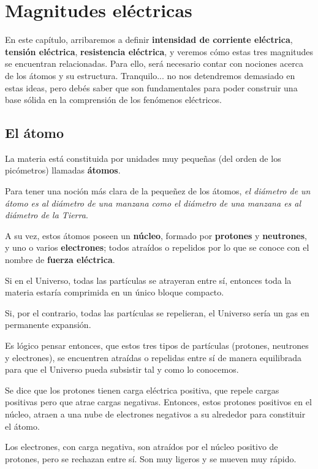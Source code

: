 \chapter{Magnitudes eléctricas}

En este capítulo, arribaremos a definir \textbf{intensidad de corriente eléctrica}, \textbf{tensión eléctrica}, \textbf{resistencia eléctrica}, y veremos cómo estas tres magnitudes se encuentran relacionadas. Para ello, será necesario contar con nociones acerca de los átomos y su estructura. Tranquilo... no nos detendremos demasiado en estas ideas, pero debés saber que son fundamentales para poder construir una base sólida en la comprensión de los fenómenos eléctricos.

\section{El átomo}

La materia está constituida por unidades muy pequeñas (del orden de los picómetros) llamadas \textbf{átomos}.

Para tener una noción más clara de la pequeñez de los átomos, \textit{el diámetro de un átomo es al diámetro de una manzana como el diámetro de una manzana es al diámetro de la Tierra}.

A su vez, estos átomos poseen un \textbf{núcleo}, formado por \textbf{protones} y \textbf{neutrones}, y uno o varios \textbf{electrones}; todos atraídos o repelidos por lo que se conoce con el nombre de \textbf{fuerza eléctrica}.

Si en el Universo, todas las partículas se atrayeran entre sí, entonces toda la materia estaría comprimida en un único bloque compacto.

Si, por el contrario, todas las partículas se repelieran, el Universo sería un gas en permanente expansión.

Es lógico pensar entonces, que estos tres tipos de partículas (protones, neutrones y electrones), se encuentren atraídas o repelidas entre sí de manera equilibrada para que el Universo pueda subsistir tal y como lo conocemos.

Se dice que los protones tienen carga eléctrica positiva, que repele cargas positivas pero que atrae cargas negativas. Entonces, estos protones positivos en el núcleo, atraen a una nube de electrones negativos a su alrededor para constituir el átomo.

Los electrones, con carga negativa, son atraídos por el núcleo positivo de protones, pero se rechazan entre sí. Son muy ligeros y se mueven muy rápido. 

